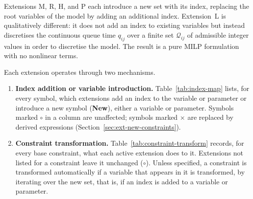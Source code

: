 Extensions M, R, H, and P each introduce a new set with its index, replacing
the root variables of the model by adding {an} additional
index. Extension~L is qualitatively different: it does not add an index to
existing variables but instead discretises the continuous queue time $q_{ij}$
over a finite set $\mathcal{Q}_{ij}$ of admissible integer values in order to
{discretise the model.}
The result is a pure MILP formulation with no nonlinear terms.

Each extension operates through two mechanisms.

\begin{enumerate}
  \item \textbf{Index addition or variable introduction.}
        Table~\ref{tab:index-map} lists, for every symbol, which extensions
        add an index to the variable or parameter or introduce a new symbol
        (\textbf{New}), either a variable or parameter.
        Symbols marked $\circ$ in a column are unaffected; symbols marked
        $\times$ are replaced by derived expressions
        (Section~\ref{sec:ext-new-constraints}).

  \item \textbf{Constraint transformation.}
        Table~\ref{tab:constraint-transform} records, for every base
        constraint, what each active extension does to it. Extensions not
        listed for a constraint leave it unchanged ($\circ$). Unless
        specified, a constraint is transformed automatically if a variable
        that appears in it is transformed, by iterating over the new set,
        that is, if an index is added to a variable or parameter.
\end{enumerate}


